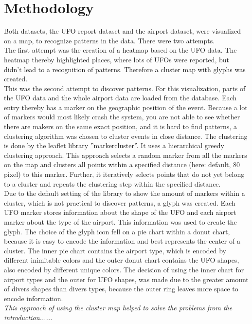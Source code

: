 \documentclass{article}
\begin{document}
\section*{Methodology}
Both datasets, the UFO report dataset and the airport dataset, were visualized on a map, to recognize patterns in the data. There were two attempts.\\
The first attempt was the creation of a heatmap based on the UFO data. The heatmap thereby highlighted places, where lots of UFOs were reported, but didn't lead to a recognition of patterns. Therefore a cluster map with glyphs was created.\\
This was the second attempt to discover patterns. For this visualization, parts of the UFO data and the whole airport data are loaded from the database. Each entry thereby has a marker on the geographic position of the event.
Because a lot of markers would most likely crash the system, you are not able to see whether there are makers on the same exact position, and it is hard to find patterns, a clustering algorithm was chosen to cluster events in close distance. The clustering is done by the leaflet library ''markercluster''. It uses a hierarchical greedy clustering approach. This approach selects a random marker from all the markers on the map and clusters all points within a specified distance (here: default, 80 pixel) to this marker. Further, it iteratively selects points that do not yet belong to a cluster and repeats the clustering step within the specified distance.\\
Due to the default setting of the library to show the amount of markers within a cluster, which is not practical to discover patterns, a glyph was created. Each UFO marker stores information about the shape of the UFO and each airport marker about the type of the airport. This information was used to create the glyph. The choice of the glyph icon fell on a pie chart within a donut chart, because it is easy to encode the information and best represents the center of a cluster. The inner pie chart contains the airport type, which is encoded by different inimitable colors and the outer donut chart contains the UFO shapes, also encoded by different unique colors. The decision of using the inner chart for airport types and the outer for UFO shapes, was made due to the greater amount of divers shapes than divers types, because the outer ring leaves more space to encode information.\\
\textit{This approach of using the cluster map helped to solve the problems from the introduction......}
\end{document}
